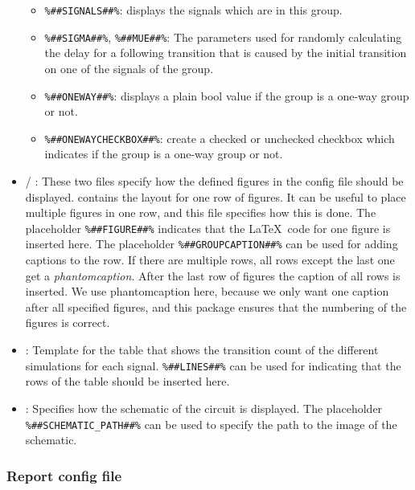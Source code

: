 \begin{itemize}
  \begin{itemize}
  \item
  	\lstinline|%##SIGNALS##%|: displays the signals which are in this group.
  \item
    \lstinline|%##SIGMA##%|, \lstinline|%##MUE##%|: The parameters used for 
    randomly calculating the delay for a following transition that is     
    caused by the initial transition on one of the signals of the group.
  \item
    \lstinline|%##ONEWAY##%|: displays a plain bool value if the group is a
    one-way group or not.
  \item
    \lstinline|%##ONEWAYCHECKBOX##%|: create a checked or unchecked checkbox
    which indicates if the group is a one-way group or not.
  \end{itemize}
\item
   / : These two 
  files   specify how the defined figures in the config file should be
  displayed.  contains the layout for
  one row of figures. It can be useful to place multiple figures in
  one row, and this file specifies how this is done. The placeholder
  \lstinline|%##FIGURE##%| indicates that the \LaTeX\ code for one figure is
  inserted here. The placeholder \lstinline|%##GROUPCAPTION##%| can be used
  for adding captions to the row. If there are multiple rows, all rows
  except the last one get a \emph{phantomcaption}. After the last row of
  figures the caption of all rows is inserted. We use phantomcaption
  here, because we only want one caption after all specified figures,
  and this package ensures that the numbering of the figures is correct.
\item
  : Template for the table that shows the transition count
  of the different simulations for each signal. \lstinline|%##LINES##%| can be 
  used for indicating that the rows of the table should be inserted here.
\item
  : Specifies how the schematic of the circuit is
  displayed. The placeholder \lstinline|%##SCHEMATIC_PATH##%| can be used to
  specify the path to the image of the schematic.
\end{itemize}

\subsubsection{Report config file}\label{sec:man-report-report-config-file}


